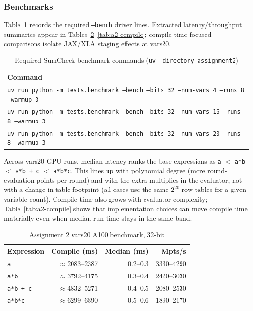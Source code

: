 \documentclass[conference]{IEEEtran}
\begin{document}
\subsubsection{Benchmarks}
Table~\ref{tab:a2-bench-cmds} records the required \texttt{--bench} driver
lines. Extracted latency/throughput summaries appear in
Tables~\ref{tab:a2-vars20}--\ref{tab:a2-compile}; compile-time-focused
comparisons isolate JAX/XLA staging effects at vars20.

\begin{table}[htbp]
\caption{Required SumCheck benchmark commands (\texttt{uv --directory assignment2})}
\label{tab:a2-bench-cmds}
\centering
\footnotesize
\setlength{\tabcolsep}{4pt}
\begin{tabularx}{\columnwidth}{@{}>{\raggedright\arraybackslash}X@{}}
\toprule
Command \\
\midrule
\texttt{uv run python -m tests.benchmark --bench --bits 32 --num-vars 4 --runs 8 --warmup 3} \\
\texttt{uv run python -m tests.benchmark --bench --bits 32 --num-vars 16 --runs 8 --warmup 3} \\
\texttt{uv run python -m tests.benchmark --bench --bits 32 --num-vars 20 --runs 8 --warmup 3} \\
\bottomrule
\end{tabularx}
\end{table}

Across vars20 GPU runs, median latency ranks the base expressions as
\texttt{a} $<$ \texttt{a*b} $<$ \texttt{a*b + c} $<$ \texttt{a*b*c}. This lines
up with polynomial degree (more round-evaluation points per round) and with the
extra multiplies in the evaluator, not with a change in table footprint (all
cases use the same $2^{20}$-row tables for a given variable count). Compile
time also grows with evaluator complexity; Table~\ref{tab:a2-compile} shows
that implementation choices can move compile time materially even when median
run time stays in the same band.

\begin{table}[htbp]
\caption{Assignment 2 vars20 A100 benchmark, 32-bit}
\label{tab:a2-vars20}
\centering
\footnotesize
\setlength{\tabcolsep}{3pt}
\begin{tabular}{@{}lrrr@{}}
\toprule
Expression & Compile (ms) & Median (ms) & Mpts/s \\
\midrule
\texttt{a}       & $\approx$2083--2387 & 0.2--0.3 & 3330--4290 \\
\texttt{a*b}     & $\approx$3792--4175 & 0.3--0.4 & 2420--3030 \\
\texttt{a*b + c} & $\approx$4832--5271 & 0.4--0.5 & 2080--2530 \\
\texttt{a*b*c}   & $\approx$6299--6890 & 0.5--0.6 & 1890--2170 \\
\bottomrule
\end{tabular}
\end{table}
\end{document}
